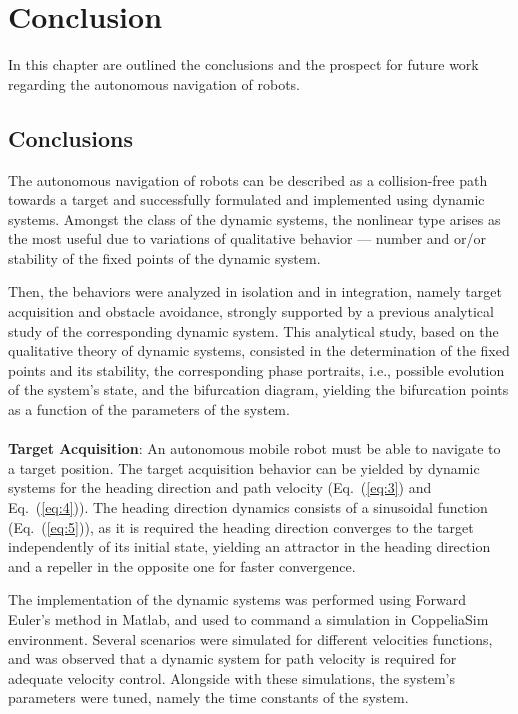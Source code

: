 \chapter{Conclusion}%
\label{ch:conclusion}
In this chapter are outlined the conclusions and the prospect for future work
regarding the autonomous navigation of robots.
%
\section{Conclusions}%
\label{ch:conclusion-concls}
The autonomous navigation of robots can be described as a collision-free path
towards a target and successfully formulated and implemented using dynamic
systems. Amongst the class of the dynamic systems, the nonlinear type arises as
the most useful due to variations of qualitative behavior --- number and or/or
stability of the fixed points of the dynamic system. 

Then, the behaviors were analyzed in isolation and in integration, namely target
acquisition and obstacle avoidance, strongly supported by a previous analytical
study of the corresponding dynamic system. This analytical study, based on the
qualitative theory of dynamic systems, consisted in the determination of the
fixed points and its stability, the corresponding phase portraits, i.e.,
possible evolution of the system's state, and the bifurcation diagram, yielding
the bifurcation points as a function of the parameters of the system.
\\\\
\textbf{Target Acquisition}: An autonomous mobile robot must be able to navigate to a target position. The
target acquisition behavior can be yielded by dynamic systems for the heading
direction and path velocity (Eq.~(\ref{eq:3}) and Eq.~(\ref{eq:4})). The heading direction dynamics consists of a
sinusoidal function (Eq.~(\ref{eq:5})), as it is required the heading direction
converges to the target independently of its initial state, yielding an attractor in the heading direction and a
repeller in the opposite one for faster convergence. 

The implementation of the
dynamic systems was performed using Forward Euler's method in Matlab, and used
to command a simulation in CoppeliaSim environment. Several scenarios were
simulated for different velocities functions, and was observed that a dynamic
system for path velocity is required for adequate velocity control. Alongside
with these simulations, the system's parameters were tuned, namely the time
constants of the system. 

